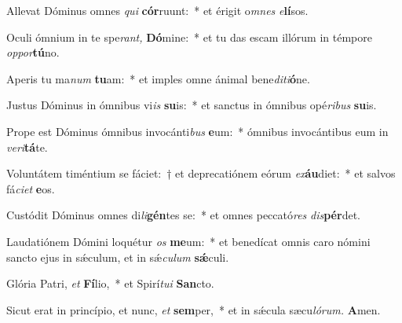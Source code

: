 \item Allevat Dóminus omnes \textit{qui} \textbf{cór}ruunt:~* et érigit o\textit{mnes} \textit{e}\textbf{lí}sos.
\item Oculi ómnium in te spe\textit{rant,} \textbf{Dó}mine:~* et tu das escam illórum in témpore \textit{oppor}\textbf{tú}no.
\item Aperis tu ma\textit{num} \textbf{tu}am:~* et imples omne ánimal bene\textit{diti}\textbf{ó}ne.
\item Justus Dóminus in ómnibus vi\textit{is} \textbf{su}is:~* et sanctus in ó\-mnibus opé\textit{ribus} \textbf{su}is.
\item Prope est Dóminus ómnibus invocánti\textit{bus} \textbf{e}um:~* ó\-mnibus invocántibus eum in \textit{veri}\textbf{tá}te.
\item Voluntátem timéntium se fáciet:~† et deprecatiónem eórum \textit{ex}\textbf{áu}diet:~* et salvos fá\textit{ciet} \textbf{e}os.
\item Custódit Dóminus omnes di\textit{li}\textbf{gén}tes se:~* et o\-mnes peccató\textit{res} \textit{dis}\textbf{pér}det.
\item Laudatiónem Dómini loquétur \textit{os} \textbf{me}um:~* et benedícat o\-mnis caro nómini sancto ejus in sǽculum, et in sǽ\hspace*{0.02em}\textit{cu}\textit{lum} \textbf{sǽ}culi.
\item Glória Patri, \textit{et} \textbf{Fí}lio,~* et Spirí\tinyhspace\textit{tui} \textbf{San}cto.
\item Sicut erat in princípio, et nunc, \textit{et} \textbf{sem}per,~* et in sǽcula sæcu\tinyhspace\textit{lórum.} \textbf{A}men.